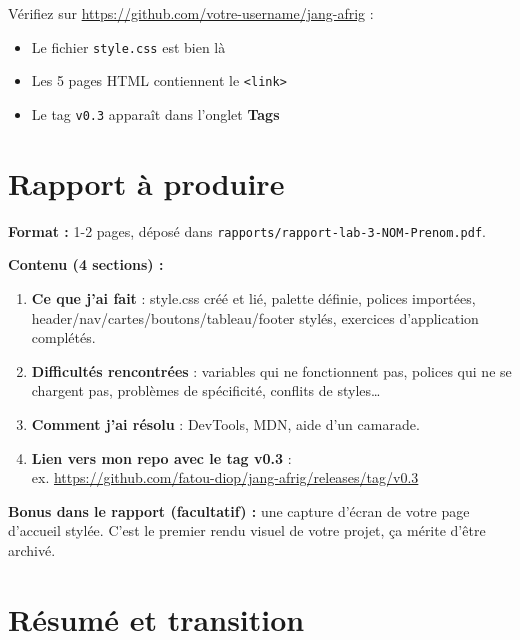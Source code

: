 \documentclass[11pt,a4paper]{article}
\begin{document}
Vérifiez sur \url{https://github.com/votre-username/jang-afrig} :
\begin{itemize}[nosep]
    \item Le fichier \texttt{style.css} est bien là
    \item Les 5 pages HTML contiennent le \texttt{<link>}
    \item Le tag \texttt{v0.3} apparaît dans l'onglet \textbf{Tags}
\end{itemize}

\section{Rapport à produire}

\begin{attentionbox}
\textbf{Format :} 1-2 pages, déposé dans \texttt{rapports/rapport-lab-3-NOM-Prenom.pdf}.

\medskip

\textbf{Contenu (4 sections) :}
\begin{enumerate}[nosep]
    \item \textbf{Ce que j'ai fait} : style.css créé et lié, palette définie, polices importées, header/nav/cartes/boutons/tableau/footer stylés, exercices d'application complétés.
    \item \textbf{Difficultés rencontrées} : variables qui ne fonctionnent pas, polices qui ne se chargent pas, problèmes de spécificité, conflits de styles\ldots
    \item \textbf{Comment j'ai résolu} : DevTools, MDN, aide d'un camarade.
    \item \textbf{Lien vers mon repo avec le tag v0.3} : \\
          ex. \url{https://github.com/fatou-diop/jang-afrig/releases/tag/v0.3}
\end{enumerate}

\medskip

\textbf{Bonus dans le rapport (facultatif) :} une capture d'écran de votre
page d'accueil stylée. C'est le premier rendu visuel de votre projet, ça
mérite d'être archivé.
\end{attentionbox}

\newpage

\section{Résumé et transition}
\end{document}
